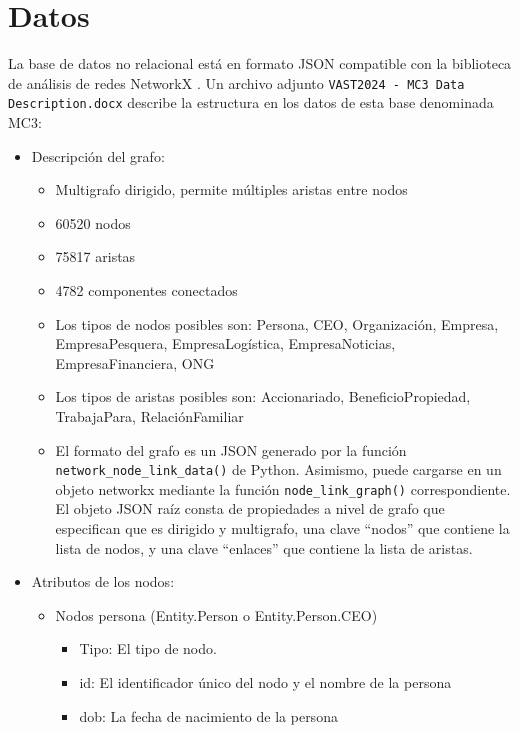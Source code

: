 \documentclass[11pt,spanish,a4paper]{article}
\begin{document}
\section{Datos}
La base de datos no relacional está en formato JSON compatible con la biblioteca de análisis de redes NetworkX \cite{noauthor_networkx_nodate}.%
Un archivo adjunto \verb'VAST2024 - MC3 Data Description.docx' describe la estructura en los datos de esta base denominada MC3:
\begin{itemize}
  \item Descripción del grafo:
  \begin{itemize}
    \item Multigrafo dirigido, permite múltiples aristas entre nodos
    \item 60520 nodos
    \item 75817 aristas
    \item 4782 componentes conectados
    \item Los tipos de nodos posibles son: Persona, CEO, Organización, Empresa, EmpresaPesquera, EmpresaLogística, EmpresaNoticias, EmpresaFinanciera, ONG
    \item Los tipos de aristas posibles son: Accionariado, BeneficioPropiedad, TrabajaPara, RelaciónFamiliar
    \item El formato del grafo es un JSON generado por la función \verb'network_node_link_data()' de Python. Asimismo, puede cargarse en un objeto networkx mediante la función \verb'node_link_graph()' correspondiente. El objeto JSON raíz consta de propiedades a nivel de grafo que especifican que es dirigido y multigrafo, una clave ``nodos'' que contiene la lista de nodos, y una clave ``enlaces'' que contiene la lista de aristas.
  \end{itemize}
  \item Atributos de los nodos:
  \begin{itemize}
    \item Nodos persona (Entity.Person o Entity.Person.CEO)
    \begin{itemize}
      \item Tipo: El tipo de nodo.
      \item id: El identificador único del nodo y el nombre de la persona
      \item dob: La fecha de nacimiento de la persona

\end{itemize}
\end{itemize}
\end{itemize}
\end{document}
